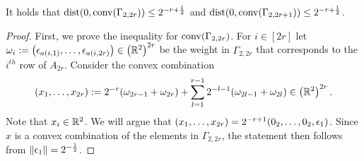 \begin{lemma}\label{lem:convCombQubits}
	It holds that $\operatorname{dist}(0, \operatorname{conv}(\Gamma_{2,2r}) ) \leq 2^{-r+ \frac{1}{2}}$ and $\operatorname{dist}(0, \operatorname{conv}(\Gamma_{2,2r+1}) ) \leq 2^{-r+ \frac{1}{2}}$.
\end{lemma}

\begin{proof}
	First, we prove the inequality for $\operatorname{conv}(\Gamma_{2,2r})$. For $i \in [2r]$ let $\omega_i := \big( \epsilon_{a(i,1)}, \ldots, \epsilon_{a(i,2r)} \big) \in \left( \mathbb R^2 \right)^{2r}$ be the weight in $\Gamma_{2,2r}$ that corresponds to the $i^{th}$ row of $A_{2r}$. Consider the convex combination
	\begin{equation}\label{eq:convCombGamma}
		(x_1, \ldots, x_{2r}) := 2^{-r} ( \omega_{2r-1} + \omega_{2r} ) + \sum_{l=1}^{r-1} 2^{-l-1} ( \omega_{2l-1} + \omega_{2l}) \in \left( \mathbb R^2 \right)^{2r}.
	\end{equation}
	Note that $x_i \in \mathbb R^2$. We will argue that $(x_1, \dots, x_{2r}) = 2^{-r+1} (0_2,\ldots,0_2, \epsilon_{1})$.
	Since $x$ is a convex combination of the elements in $\Gamma_{2,2r}$, the statement then follows from $\| \epsilon_1 \| = 2^{-\frac{1}{2}}$.
	

\end{proof}
